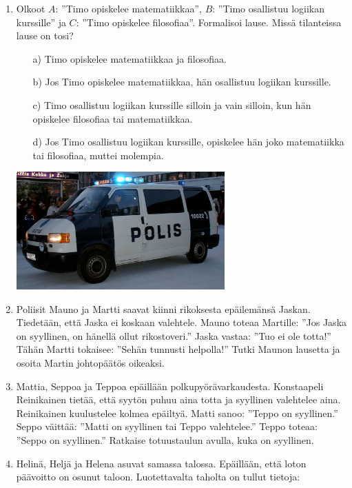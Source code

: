 \begin{enumerate}
\item
Olkoot $A$: ''Timo opiskelee matematiikkaa'', $B$: ''Timo osallistuu logiikan kurssille'' ja $C$: ''Timo opiskelee filosofiaa''. Formalisoi lause. Missä tilanteissa lause on tosi?
\begin{itemize}
\item[a)] Timo opiskelee matematiikkaa ja filosofiaa.
\item[b)] Jos Timo opiskelee matematiikkaa, hän osallistuu logiikan kurssille.
\item[c)] Timo osallistuu logiikan kurssille silloin ja vain silloin, kun hän opiskelee filosofiaa tai matematiikkaa.
\item[d)] Jos Timo osallistuu logiikan kurssille, opiskelee hän joko matematiikka tai filosofiaa, muttei molempia.
\end{itemize}

\bigskip

\begin{center}
\includegraphics[width=8cm]{pictures/kuvitus/Finnish_police_car} %
\end{center}

\item Poliisit Mauno ja Martti saavat kiinni rikoksesta epäilemänsä Jaskan. Tiedetään, että Jaska ei koskaan valehtele. Mauno toteaa Martille: ''Jos Jaska on syyllinen, on hänellä ollut rikostoveri.'' Jaska vastaa: ''Tuo ei ole totta!'' Tähän Martti tokaisee: ''Sehän tunnusti helpolla!'' Tutki Maunon lausetta ja osoita Martin johtopäätös oikeaksi.

\item Mattia, Seppoa ja Teppoa epäillään polkupyörävarkaudesta. Konstaapeli Reinikainen tietää, että syytön puhuu aina totta ja syyllinen valehtelee aina. Reinikainen kuulustelee kolmea epäiltyä. Matti sanoo: ''Teppo on syyllinen.'' Seppo väittää: ''Matti on syyllinen tai Teppo valehtelee.'' Teppo toteaa: ''Seppo on syyllinen.'' Ratkaise totuustaulun avulla, kuka on syyllinen. 

\item Helinä, Heljä ja Helena asuvat samassa talossa. Epäillään, että loton päävoitto on osunut taloon. Luotettavalta taholta on tullut tietoja:


\end{enumerate}
